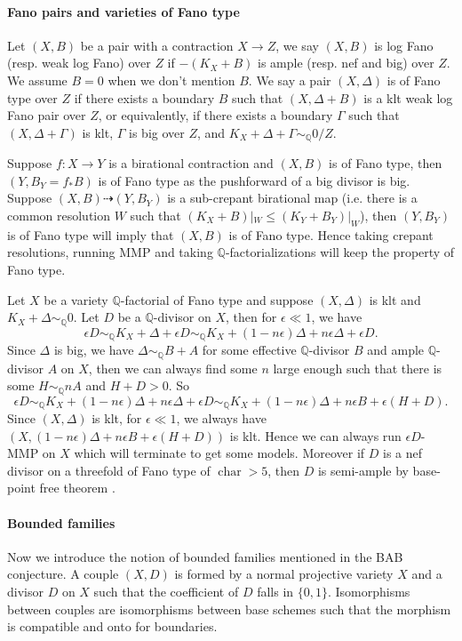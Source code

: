 \documentclass[letterpaper,reqno,12pt]{amsart}
\DeclareMathOperator{\chara}{char}
\newcommand{\tbf}{\textbf}
\numberwithin{equation}{section}
\theoremstyle{plain}
\begin{document}
\paragraph{\tbf{Fano pairs and varieties of Fano type}}
Let $(X,B)$ be a pair with a contraction $X\to Z$, we say $(X,B)$ is log Fano (resp. weak log Fano) over $Z$ if $-(K_X+B)$ is ample (resp. nef and big) over $Z$. We assume $B=0$ when we don't mention $B$. We say a pair $(X,\Delta)$ is of Fano type over $Z$ if there exists a boundary $B$ such that $(X,\Delta+B)$ is a klt weak log Fano pair over $Z$, or equivalently, if there exists a boundary $\Gamma$ such that $(X,\Delta+\Gamma)$ is klt, $\Gamma$ is big over $Z$, and $K_{X}+\Delta+\Gamma\sim_{\mathbb{Q}}0/Z$.

Suppose $f:X\to Y$ is a birational contraction and $(X,B)$ is of Fano type, then $(Y,B_Y=f_*B)$ is of Fano type as the pushforward of a big divisor is big. Suppose $(X,B)\dashrightarrow(Y,B_Y)$ is a sub-crepant birational map (i.e. there is a common resolution $W$ such that $(K_X+B)|_W\leq (K_Y+B_Y)|_W$), then $(Y,B_Y)$ is of Fano type will imply that $(X,B)$ is of Fano type. Hence taking crepant resolutions, running MMP and taking $\mathbb Q$-factorializations will keep the property of Fano type.

Let $X$ be a variety $\mathbb Q$-factorial of Fano type and suppose $(X,\Delta)$ is klt and $K_X+\Delta\sim_{\mathbb Q}0$. Let $D$ be a $\mathbb Q$-divisor on $X$, then for $\epsilon\ll 1$, we have \[\epsilon D\sim_{\mathbb Q} K_X+\Delta+\epsilon D\sim_{\mathbb Q}K_X+(1-n\epsilon)\Delta +n\epsilon \Delta+\epsilon D.\] Since $\Delta$ is big, we have $\Delta\sim_{\mathbb Q} B+A$ for some effective $\mathbb Q$-divisor $B$ and ample $\mathbb Q$-divisor $A$ on $X$, then we can always find some $n$ large enough such that there is some $ H\sim_{\mathbb Q} nA$ and $H+D>0$. So 
\[\epsilon D\sim_{\mathbb Q}K_X+(1-n\epsilon)\Delta +n\epsilon \Delta+\epsilon D\sim_{\mathbb Q}K_X+(1-n\epsilon)\Delta+ n\epsilon B+\epsilon (H+D).\]
Since $(X,\Delta)$ is klt, for $\epsilon\ll 1$, we always have $(X,(1-n\epsilon)\Delta+ n\epsilon B+\epsilon (H+D))$ is klt. Hence we can always run $\epsilon D$-MMP on $X$ which will terminate to get some models. Moreover if $D$ is a nef divisor on a threefold of Fano type of $\chara>5$, then $D$ is semi-ample by base-point free theorem \cite[1.2]{birkar2014existencemorifibrespaces}.

\paragraph{\tbf{Bounded families}}
Now we introduce the notion of bounded families mentioned in the BAB conjecture. A couple $(X,D)$ is formed by a normal projective variety $X$ and a divisor $D$ on $X$ such that the coefficient of $D$ falls in $\{0,1\}$. Isomorphisms between couples are isomorphisms between base schemes such that the morphism is compatible and onto for boundaries. 
\end{document}

